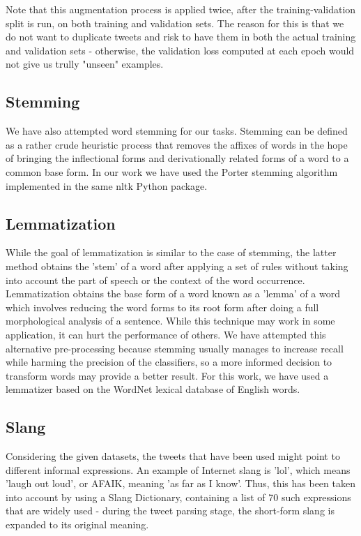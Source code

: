 \documentclass[11pt,a4paper]{article}
\begin{document}
Note that this augmentation process is applied twice, after the training-validation split is run, on both training and validation sets. The reason for this is that we do not want to duplicate tweets and risk to have them in both the actual training and validation sets - otherwise, the validation loss computed at each epoch would not give us trully "unseen" examples.

\subsection{Stemming}

We have also attempted word stemming for our tasks. Stemming can be defined as a rather crude heuristic process that removes the affixes of words in the hope of bringing the inflectional forms and derivationally related forms of a word to a common base form. In our work we have used the Porter stemming algorithm implemented in the same nltk Python package.

\subsection{Lemmatization}

While the goal of lemmatization is similar to the case of stemming, the latter method obtains the 'stem' of a word after applying a set of rules without taking into account the part of speech or the context of the word occurrence. Lemmatization obtains the base form of a word known as a 'lemma' of a word which involves reducing the word forms to its root form after doing a full morphological analysis of a sentence. While this technique may work in some application, it can hurt the performance of others. We have attempted this alternative pre-processing because stemming usually manages to increase recall while harming the precision of the classifiers, so a more informed decision to transform words may provide a better result. For this work, we have used a lemmatizer based on the WordNet lexical database of English words.

\subsection{Slang}

Considering the given datasets, the tweets that have been used might point to different informal expressions. An example of Internet slang is 'lol', which means 'laugh out loud', or AFAIK, meaning 'as far as I know'. Thus, this has been taken into account by using a Slang Dictionary, containing a list of 70 such expressions that are widely used - during the tweet parsing stage, the short-form slang is expanded to its original meaning.
\end{document}
